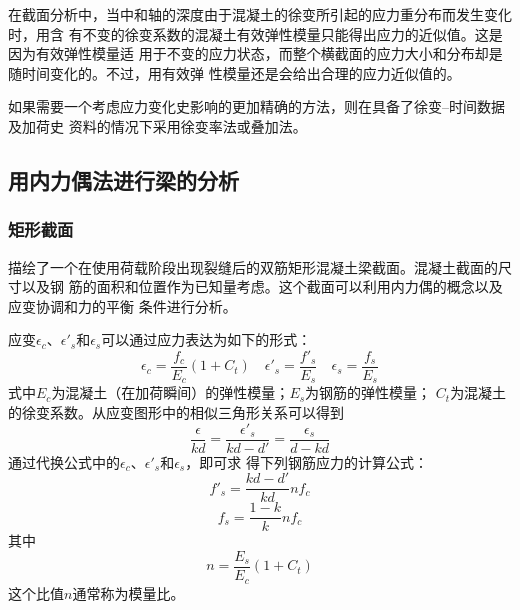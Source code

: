 \documentclass[12pt,a4paper]{book}
\begin{document}
在截面分析中，当中和轴的深度由于混凝土的徐变所引起的应力重分布而发生变化时，用含
有不变的徐变系数的混凝土有效弹性模量只能得出应力的近似值。这是因为有效弹性模量适
用于不变的应力状态，而整个横截面的应力大小和分布却是随时间变化的。不过，用有效弹
性模量还是会给出合理的应力近似值的。

如果需要一个考虑应力变化史影响的更加精确的方法，则在具备了徐变--时间数据及加荷史
资料的情况下采用徐变率法或叠加法。

\subsection{用内力偶法进行梁的分析}

\subsubsection{矩形截面}

描绘了一个在使用荷载阶段出现裂缝后的双筋矩形混凝土梁截面。混凝土截面的尺寸以及钢
筋的面积和位置作为已知量考虑。这个截面可以利用内力偶的概念以及应变协调和力的平衡
条件进行分析。

应变$\epsilon_c$、$\epsilon'_s$和$\epsilon_s$可以通过应力表达为如下的形式：
\begin{equation*}
\epsilon_c=\frac{f_c}{E_c}(1+C_t)\quad\epsilon'_s=\frac{f'_s}{E_s}\quad\epsilon_s=\frac{f_s}{E_s}
\end{equation*}式中$E_c$为混凝土（在加荷瞬间）的弹性模量；$E_s$为钢筋的弹性模量；
$C_t$为混凝土的徐变系数。从应变图形中的相似三角形关系可以得到
\begin{equation*}
\frac{\epsilon}{kd}=\frac{\epsilon'_s}{kd-d'}=\frac{\epsilon_s}{d-kd}
\end{equation*}通过代换公式中的$\epsilon_c$、$\epsilon'_s$和$\epsilon_s$，即可求
得下列钢筋应力的计算公式：
\begin{equation}
  \label{eq:27} f'_s=\frac{kd-d'}{kd}nf_c
\end{equation}
\begin{equation}
  \label{eq:24} f_s=\frac{1-k}{k}nf_c
\end{equation}其中
\begin{equation}
  \label{eq:28} n=\frac{E_s}{E_c}(1+C_t)
\end{equation}这个比值$n$通常称为模量比。
\end{document}
